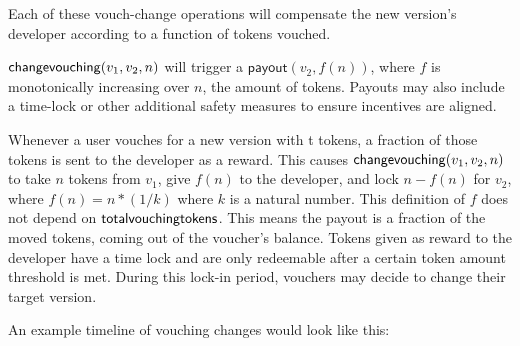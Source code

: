 \documentclass[]{article}
\makeatletter
\let\_\relax
\DeclareRobustCommand{\_}{%
  \leavevmode\vbox{%
    \hrule\@width.5em
          \@height-.26ex
          \@depth\dimexpr.26ex+.28pt\relax}}
\makeatother
\begin{document}
Each of these vouch-change operations will compensate the new version's
developer according to a function of tokens vouched.

$\mathsf{change\_vouching}(v_1, v_2, n)$ will trigger a
$\mathsf{payout}(v_2, f(n))$, where $f$ is monotonically increasing over $n$,
the amount of tokens. Payouts may also include a time-lock or other additional
safety measures to ensure incentives are aligned.

Whenever a user vouches for a new version with t tokens, a fraction of
those tokens is sent to the developer as a reward. This causes
$\mathsf{change\_vouching}(v_1, v_2, n)$ to take $n$ tokens from $v_1$, give $f(n)$
to the developer, and lock $n - f(n)$ for $v_2$, where $f(n) = n * (1/k)$
where $k$ is a natural number. This definition of $f$ does not depend
on $\mathsf{total\_vouching\_tokens}$. This means the payout is a fraction of the
moved tokens, coming out of the voucher's balance.
Tokens given as reward to the developer have a time lock and are only
redeemable after a certain token amount threshold is met. During this lock-in
period, vouchers may decide to change their target version.

\pagebreak

  An example timeline of vouching changes would look like this:
\end{document}
